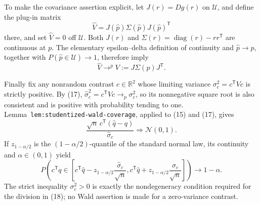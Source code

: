 To make the covariance assertion explicit, let \(J(r)=Dg(r)\) on
\(\mathcal U\), and define the plug-in matrix
\[
\widehat V=J(\widehat p)\Sigma(\widehat p)J(\widehat p)^{\mathsf T}
\tag{16}
\]
there, and set \(\widehat V=0\) off \(\mathcal U\).  Both \(J(r)\) and
\(\Sigma(r)=\operatorname{diag}(r)-rr^{\mathsf T}\) are continuous at
\(p\).  The elementary epsilon--delta definition of continuity and
\(\widehat p\to p\), together with
\(P(\widehat p\in\mathcal U)\to1\), therefore imply
\[
\widehat V\mathrel{\mathop{\longrightarrow}^{p}}
V:=J\Sigma(p)J^{\mathsf T}.
\tag{17}
\]

Finally fix any nonrandom contrast \(c\in\mathbb R^2\) whose limiting
variance \(\sigma_c^2=c^{\mathsf T}Vc\) is strictly positive.  By (17),
\(\widehat\sigma_c^2=c^{\mathsf T}\widehat Vc\to_p\sigma_c^2\), so its
nonnegative square root is also consistent and is positive with probability
tending to one.  Lemma~\texttt{lem:studentized-wald-coverage}, applied to
(15) and (17), gives
\[
\frac{\sqrt n\,c^{\mathsf T}(\widehat q-q)}{\widehat\sigma_c}
\Rightarrow\mathcal N(0,1).
\tag{18}
\]
If \(z_{1-\alpha/2}\) is the \((1-\alpha/2)\)-quantile of the standard
normal law, its continuity and \(\alpha\in(0,1)\) yield
\[
P\!\left(
c^{\mathsf T}q\in
\left[c^{\mathsf T}\widehat q
\mathbin{-}z_{1-\alpha/2}\frac{\widehat\sigma_c}{\sqrt n},
c^{\mathsf T}\widehat q
\mathbin{+}z_{1-\alpha/2}\frac{\widehat\sigma_c}{\sqrt n}
\right]
\right)\longrightarrow1-\alpha.
\tag{19}
\]
The strict inequality \(\sigma_c^2>0\) is exactly the nondegeneracy
condition required for the division in (18); no Wald assertion is made for
a zero-variance contrast.